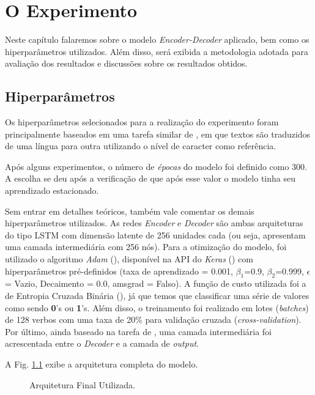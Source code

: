 \chapter{O Experimento}
\label{ch:07}

Neste capítulo falaremos sobre o modelo \textit{Encoder-Decoder} aplicado, bem como os hiperparâmetros utilizados. Além disso, será exibida a metodologia adotada para avaliação dos resultados e discussões sobre os resultados obtidos.

\section{Hiperparâmetros}
\label{sec:treinamento}

Os hiperparâmetros selecionados para a realização do experimento foram principalmente baseados em uma tarefa similar de \cite{cholletseq2seq}, em que textos são traduzidos de uma língua para outra utilizando o nível de caracter como referência.

Após alguns experimentos, o número de \textit{épocas} do modelo foi definido como 300. A escolha se deu após a verificação de que após esse valor o modelo tinha seu aprendizado estacionado.

Sem entrar em detalhes teóricos, também vale comentar os demais hiperparâmetros utilizados. As redes \textit{Encoder} e \textit{Decoder} são ambas arquiteturas do tipo LSTM com dimensão latente de 256 unidades cada (ou seja, apresentam uma camada intermediária com 256 nós). Para a otimização do modelo, foi utilizado o algoritmo \textit{Adam} (\cite{adam:2014}), disponível na API do \textit{Keras} (\cite{chollet2015keras}) com hiperparâmetros pré-definidos (taxa de aprendizado = 0.001, $\beta_{1}$=0.9, $\beta_{2}$=0.999, $\epsilon$ = Vazio, Decaimento = 0.0, amsgrad = Falso). A função de custo utilizada foi a de Entropia Cruzada Binária (\cite{francois2017deep}), já que temos que classificar uma série de valores como sendo \textbf{0}'s ou \textbf{1}'s. Além disso, o treinamento foi realizado em lotes (\textit{batches}) de 128 verbos com uma taxa de 20\% para validação cruzada (\textit{cross-validation}). Por último, ainda baseado na tarefa de \cite{cholletseq2seq}, uma camada intermediária foi acrescentada entre o \textit{Decoder} e a camada de \textit{output}.

A Fig. \ref{fig:encoder-decoder} exibe a arquitetura completa do modelo.

\begin{figure}[H]
\caption{\label{fig:encoder-decoder} Arquitetura Final Utilizada.}
\end{figure}


